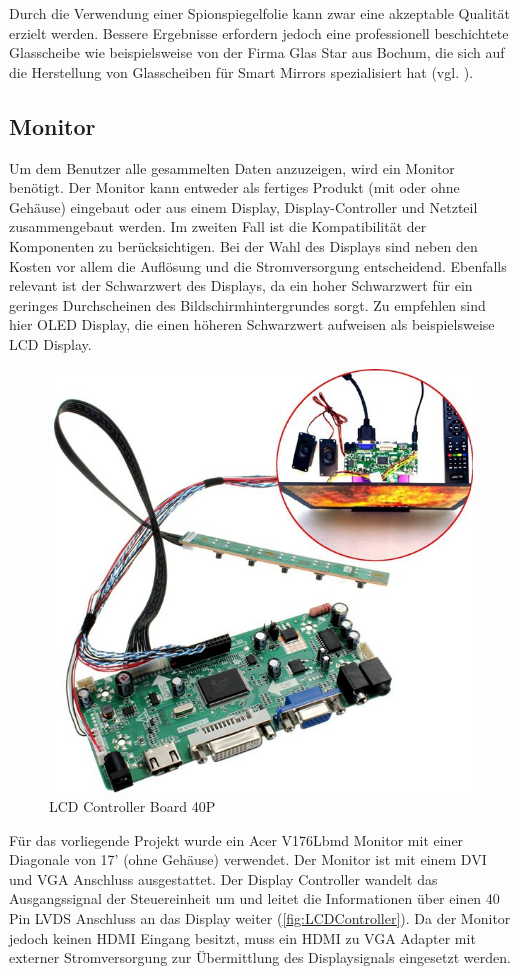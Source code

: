 Durch die Verwendung einer Spionspiegelfolie kann zwar eine akzeptable Qualität erzielt werden. Bessere Ergebnisse erfordern jedoch eine professionell beschichtete Glasscheibe wie beispielsweise von der Firma Glas Star aus Bochum, die sich auf die Herstellung von Glasscheiben für Smart Mirrors spezialisiert hat (vgl. \cite{glasstar}). 	

\subsection{Monitor}
Um dem Benutzer alle gesammelten Daten anzuzeigen, wird ein Monitor benötigt. Der Monitor kann entweder als fertiges Produkt (mit oder ohne Gehäuse) eingebaut oder aus einem Display,  Display-Controller und Netzteil zusammengebaut werden. Im zweiten Fall ist die Kompatibilität der Komponenten zu berücksichtigen. Bei der Wahl des Displays sind neben den Kosten vor allem die Auflösung und die Stromversorgung entscheidend. Ebenfalls relevant ist der Schwarzwert des Displays, da ein hoher Schwarzwert für ein geringes Durchscheinen des Bildschirmhintergrundes sorgt. Zu empfehlen sind hier OLED Display, die einen höheren Schwarzwert aufweisen als beispielsweise LCD Display.  
\begin{figure}[H]
	\includegraphics[trim=0mm 0mm 0mm 0mm, scale=1]{bilder/dcontroller.jpg}
	\caption{LCD Controller Board 40P}
	\label{fig:LCDController}
\end{figure}
Für das vorliegende Projekt wurde ein Acer V176Lbmd Monitor mit einer Diagonale von 17' (ohne Gehäuse) verwendet. Der Monitor ist mit einem DVI und VGA Anschluss ausgestattet. Der Display Controller wandelt das Ausgangssignal der Steuereinheit um und leitet die Informationen über einen 40 Pin LVDS Anschluss an das Display weiter (\autoref{fig:LCDController}). Da der Monitor jedoch keinen HDMI Eingang besitzt, muss ein HDMI zu VGA Adapter mit externer Stromversorgung zur Übermittlung des Displaysignals eingesetzt werden.
 

